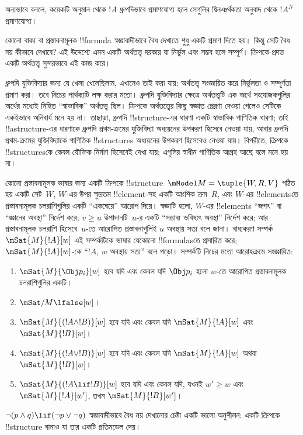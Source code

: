 \documentclass[../../../include/open-logic-section]{subfiles}
\begin{document}
অন্যভাবে বললে, কয়েকটি অনুমান থেকে $!A$ ধ্রুপদিভাবে প্রমাণযোগ্য হলে
সেগুলির দ্বিনঞর্থকতা অনুবাদ থেকে $!A^N$ প্রমাণযোগ্য।

কোনো বাক্য বা প্রস্তাবনামূলক !!{formula} স্বজ্ঞাবাদীভাবে বৈধ দেখাতে
শুধু একটি প্রমাণ দিতে হয়। কিন্তু সেটি বৈধ নয় কীভাবে দেখাবে? এই
উদ্দেশ্যে এমন একটি অর্থতত্ত্ব দরকার যা নির্ভুল এবং সম্ভব হলে সম্পূর্ণ।
ক্রিপকে-প্রদত্ত একটি অর্থতত্ত্ব সুন্দরভাবে এই কাজ করে।

ধ্রুপদি যুক্তিবিদ্যার জন্য যে খেলা খেলেছিলাম, এখানেও তাই করা যায়:
অর্থতত্ত্ব সংজ্ঞায়িত করে নির্ভুলতা ও সম্পূর্ণতা প্রমাণ করা। তবে নিচের
পার্থক্যটি লক্ষ করার মতো। ধ্রুপদি যুক্তিবিদ্যার ক্ষেত্রে অর্থতত্ত্বটি
এক অর্থে সংযোজকগুলির অর্থের মধ্যেই নিহিত “স্বাভাবিক” অর্থতত্ত্ব ছিল।
ক্রিপকে অর্থতত্ত্বের কিছু স্বজ্ঞাত প্রেরণা দেওয়া গেলেও সেটিকে একইভাবে
অনিবার্য মনে হয় না। তাছাড়া, ধ্রুপদি !!{structure}-এর ধারণা একটি
স্বাভাবিক গাণিতিক ধারণা; তাই !!a{structure}-এর ধারণাকে ধ্রুপদি
প্রথম-ক্রমের যুক্তিবিদ্যা অধ্যয়নের উপকরণ হিসেবে নেওয়া যায়, আবার
ধ্রুপদি প্রথম-ক্রমের যুক্তিবিদ্যাকে গাণিতিক !!{structure}s অধ্যয়নের
উপকরণ হিসেবেও নেওয়া যায়। বিপরীতে, ক্রিপকে !!{structure}sকে কেবল
যৌক্তিক নির্মাণ হিসেবেই দেখা যায়; এগুলির স্বাধীন গাণিতিক আগ্রহ আছে
বলে মনে হয় না।

কোনো প্রস্তাবনামূলক ভাষার জন্য একটি ক্রিপকে !!{structure}~$\mModel M
= \tuple{W, R, V}$ গঠিত হয় একটি সেট~$W$, $W$-এর উপর ক্ষুদ্রতম
!!{element}-সহ একটি আংশিক ক্রম~$R$, এবং $W$-এর !!{element}sতে
প্রস্তাবনামূলক চলরাশিগুলির একটি “একঘেয়ে” আরোপ দিয়ে। স্বজ্ঞাটি হলো,
$W$-এর !!{element}s “জগৎ” বা “জ্ঞানের অবস্থা” নির্দেশ করে; $v \geq
u$ উপাদানটি~$u$-র একটি “সম্ভাব্য ভবিষ্যৎ অবস্থা” নির্দেশ করে; আর
প্রস্তাবনামূলক চলরাশি হিসেবে~$u$-তে আরোপিত প্রস্তাবনাগুলিই $u$ অবস্থায়
সত্য বলে জানা। বাধ্যকরণ সম্পর্ক $\mSat{M}{!A}[w]$ এই সম্পর্কটিকে
ভাষার যেকোনো !!{formula}sতে প্রসারিত করে; $\mSat{M}{!A}[w]$-কে
“$!A$, $w$ অবস্থায় সত্য” বলে পড়ো। সম্পর্কটি নিচের মতো আরোহক্রমে
সংজ্ঞায়িত:
\begin{enumerate}
\item $\mSat{M}{\Obj p_i}[w]$ হবে যদি এবং কেবল যদি $\Obj p_i$ হলো
  $w$-তে আরোপিত প্রস্তাবনামূলক চলরাশিগুলির একটি।
\item $\mSat/{M}{\lfalse}[w]$।
\item $\mSat{M}{(!A \land !B)}[w]$ হবে যদি এবং কেবল যদি
  $\mSat{M}{!A}[w]$ এবং $\mSat{M}{!B}[w]$।
\item $\mSat{M}{(!A \lor !B)}[w]$ হবে যদি এবং কেবল যদি
  $\mSat{M}{!A}[w]$ অথবা $\mSat{M}{!B}[w]$।
\item $\mSat{M}{(!A \lif !B)}[w]$ হবে যদি এবং কেবল যদি, যখনই
  $w' \geq w$ এবং $\mSat{M}{!A}[w']$, তখন $\mSat{M}{!B}[w']$।
\end{enumerate}
$\lnot (p \land q) \lif (\lnot p \lor \lnot q)$ স্বজ্ঞাবাদীভাবে
বৈধ নয় দেখানোর চেষ্টা একটি ভালো অনুশীলন: একটি ক্রিপকে
!!{structure} বানাও যা তার একটি প্রতিমডেল দেয়।
\end{document}
